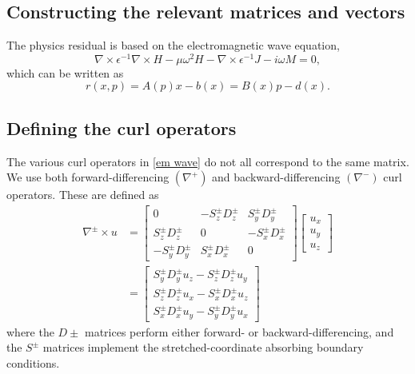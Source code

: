 \documentclass{article}
\begin{document}
\begin{appendix}
\section{Constructing the relevant matrices and vectors}
The physics residual is based on the electromagnetic wave equation, 
    \begin{equation}
    \nabla \times \epsilon^{-1} \nabla \times H - \mu \omega^2 H - 
        \nabla \times \epsilon^{-1} J - i \omega M = 0, \label{em wave}
    \end{equation}
    which can be written as
    \begin{equation}
    r(x,p) = A(p) x - b(x) = B(x) p - d(x).
    \end{equation}

\subsection{Defining the curl operators}
The various curl operators in \eqref{em wave} do not all
    correspond to the same matrix.
We use both forward-differencing $(\nabla^+)$
    and backward-differencing $(\nabla^-)$ curl operators.
These are defined as
    \begin{subequations}\begin{align}
    \nabla^\pm \times u &= \begin{bmatrix}
        0 & -S_z^\pm D_z^\pm & S_y^\pm D_y^\pm \\
        S_z^\pm D_z^\pm & 0 & -S_x^\pm D_x^\pm \\
        -S_y^\pm D_y^\pm & S_x^\pm D_x^\pm & 0 \end{bmatrix}
        \begin{bmatrix} u_x \\ u_y \\ u_z \end{bmatrix}
    \\
    &= \begin{bmatrix}
        S_y^\pm D_y^\pm u_z - S_z^\pm D_z^\pm u_y \\
        S_z^\pm D_z^\pm u_x - S_x^\pm D_x^\pm u_z \\
        S_x^\pm D_x^\pm u_y - S_y^\pm D_y^\pm u_x
        \end{bmatrix}
    \end{align}\end{subequations}
    where the $D\pm$ matrices perform either forward- or backward-differencing,
    and the $S^\pm$ matrices implement the stretched-coordinate 
    absorbing boundary conditions\cite{scpml}.


\end{appendix}
\end{document}
